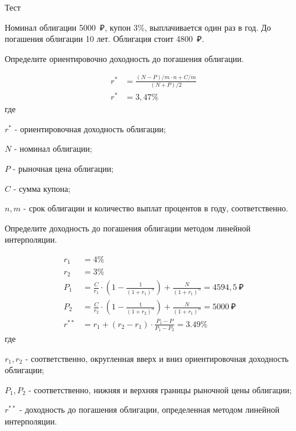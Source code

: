 \documentclass[12pt, table, twoside, a4paper]{exam}
\begin{document}
\setcounter{section}{0\relax}%

\noindent

\normalsize
\begin{questions}
\question[9] Тест
\answerstotestShort

\question[20] Номинал облигации 5000~₽, купон 3\%, выплачивается один раз в год. До погашения облигации 10 лет. Облигация стоит 4800~₽. 
\noaddpoints
\begin{subparts}
	\subpart[10] Определите ориентировочно доходность до погашения облигации.
	\begin{solution}[10em]
		\begin{align*}
		r^*&=\frac{(N-P)/m \cdot n + C/m }{(N+P)/2}\\
		r^*&=3,47\%
		\end{align*}
		где
		
		$r^*$ - ориентировочная доходность облигации;
		
		$N$ - номинал облигации;
		
		$P$ - рыночная цена облигации;
		
		$C$ - сумма купона;
		
		$n, m$ - срок облигации и количество выплат процентов в году, соответственно.
	\end{solution}
	
	\subpart[10] Определите доходность до погашения облигации методом линейной интерполяции.
	
	\begin{solution}[10em]
		\begin{align*}
		r_1&=4\%\\
		r_2&=3\%\\
		P_1&=\frac{C}{r_1} \cdot \left(1 - \frac{1}{(1+r_1)^n} \right) + \frac{N}{(1+r_1)^n}=4594,5~₽\\
		P_2&=\frac{C}{r_2} \cdot \left(1 - \frac{1}{(1+r_2)^n} \right) + \frac{N}{(1+r_1)^n}=5000~₽\\
		r^{**}&=r_1+(r_2-r_1) \cdot \frac{P_1-P}{P_1-P_2}=3.49\%
		\end{align*}	
		где
		
		$r_1, r_2$ - соответственно, округленная вверх и вниз ориентировочная доходность облигации;
		
		$P_1, P_2$ - соответственно, нижняя и верхняя границы рыночной цены облигации;
		
		$r^{**}$ - доходность до погашения облигации, определенная методом линейной интерполяции.
	\end{solution}
	

\end{subparts}
\end{questions}
\end{document}
